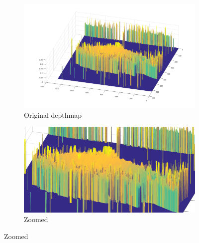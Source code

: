 \begin{figure}[H]
    \begin{subfigure}{0.41\textwidth}
        \includegraphics[width=\linewidth]{images/results/3D_plots/original_3D_87}
        \caption{Original depthmap}
    \end{subfigure}\hspace*{\fill}
    \begin{subfigure}{0.57\textwidth}
        \includegraphics[width=\linewidth]{images/results/3D_plots/zoomed_original_3D_87}
        \caption{Zoomed}
    \end{subfigure}
    

\end{figure}

